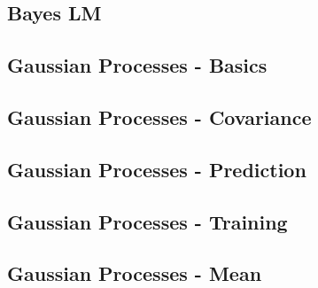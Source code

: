 

\subsection{Bayes LM}

\subsection{Gaussian Processes - Basics}

\subsection{Gaussian Processes - Covariance}

\subsection{Gaussian Processes - Prediction}

\subsection{Gaussian Processes - Training}

\subsection{Gaussian Processes - Mean}

